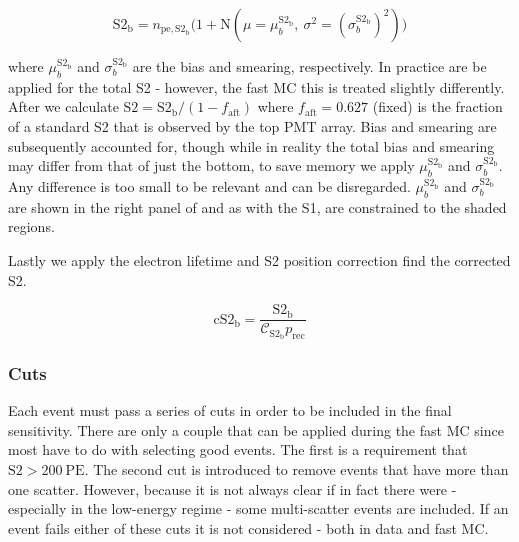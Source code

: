 \begin{equation}
\mathrm{S2_b} = n_{\mathrm{pe,S2_b}} \Big( 1 + \mathrm{N}(\mu = \mu_{b}^{\mathrm{S2_b}},\ \sigma^2 = (\sigma_{b}^{\mathrm{S2_b}})^2) \Big)
\label{eq:er_nr_calibrations_parameter_determ_det_phys_s2_bias_smear}
\end{equation}

\noindent where $\mu_{b}^{\mathrm{S2_b}}$ and $\sigma_{b}^{\mathrm{S2_b}}$ are the \stwob bias and smearing,
respectively.  In practice  are be applied
for the total S2 - however, the fast MC this is treated
slightly differently.  After  we calculate
$\mathrm{S2} = \mathrm{S2_b} / (1 - f_{\mathrm{aft}})$ where $f_{\mathrm{aft}} = 0.627$ (fixed) is the fraction of a standard S2 that
is observed by the top PMT array.  Bias and smearing are subsequently accounted for, though while in reality the total bias and smearing
may differ from that of just the bottom, to save memory we apply $\mu_{b}^{\mathrm{S2_b}}$ and $\sigma_{b}^{\mathrm{S2_b}}$.  Any
difference is too small to be relevant and can be disregarded.  $\mu_{b}^{\mathrm{S2_b}}$ and $\sigma_{b}^{\mathrm{S2_b}}$ are shown in
the right panel of  and as with the S1, are constrained to the
shaded regions.

Lastly we apply the electron lifetime and S2 position correction find the corrected S2.

\begin{equation}
\mathrm{cS2_b} = \frac{\mathrm{S2_b}}{\mathcal{C}_{\mathrm{S2_b}} p_{\mathrm{rec}}}
\end{equation}



\subsubsection{Cuts}
\label{subsubsec:er_nr_calibrations_parameter_determ_cuts}
Each event must pass a series of cuts in order to be included in the final sensitivity.  There are only a couple that can be applied
during the fast MC since most have to do with selecting good events.  The first is a requirement that
$\mathrm{S2} > 200\ \mathrm{PE}$.  The second cut is introduced to remove events that have more than one scatter.  However, because it is
not always clear if in fact there were - especially in the low-energy regime - some multi-scatter events are included.  If an event
fails either of these cuts it is not considered - both in data and fast MC.

